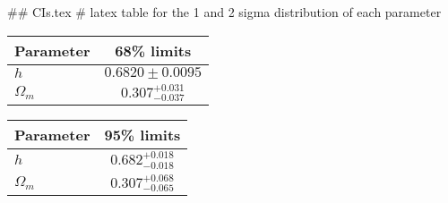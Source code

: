 ## CIs.tex
# latex table for the 1 and 2 sigma distribution of each parameter

\begin{tabular} { l  c}
 Parameter &  68\% limits\\
\hline
{\boldmath$h              $} & $0.6820\pm 0.0095          $\\
{\boldmath$\Omega_m       $} & $0.307^{+0.031}_{-0.037}   $\\
\hline
\end{tabular}

\begin{tabular} { l  c}
 Parameter &  95\% limits\\
\hline
{\boldmath$h              $} & $0.682^{+0.018}_{-0.018}   $\\
{\boldmath$\Omega_m       $} & $0.307^{+0.068}_{-0.065}   $\\
\hline
\end{tabular}
